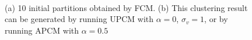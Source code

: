 \documentclass[conference]{IEEEtran}
\theoremstyle{definition}
\begin{document}
\begin{figure}[tb]
\captionsetup[subfloat]{farskip=1pt,captionskip=1pt}%
   \centering
    \\
\caption{(a) 10 initial partitions obtained by FCM. (b) This clustering result can be generated by running UPCM with $\alpha=0$, $\sigma_v=1$, or by running APCM with $\alpha=0.5$ }
\label{fig_background_noise}
\end{figure}
\end{document}
